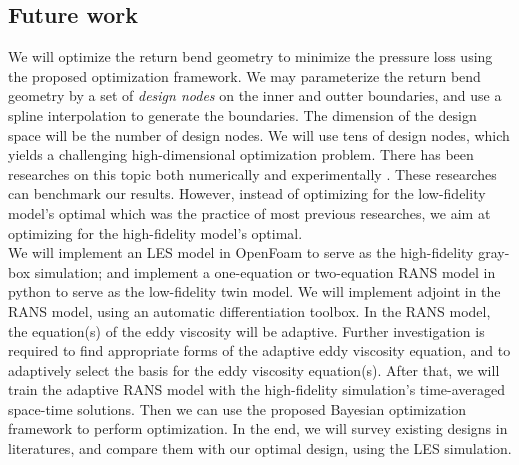\documentclass[a4paper,onecolumn]{article}
\theoremstyle{remark}
\begin{document}
\subsection{Future work}
\noindent We will optimize the return bend geometry to minimize the pressure loss using the
proposed optimization framework. We may parameterize the return bend
geometry by a set of \emph{design nodes} on the inner and outter boundaries, 
and use a spline interpolation to generate the
boundaries. The dimension of the design space will be the number of design nodes.
We will use tens of design nodes, which yields a challenging high-dimensional optimization problem.
There has been researches on this topic both numerically and experimentally
\cite{ubend rans opt 1, ubend rans opt 2}. These researches can benchmark our results.
However, instead of optimizing for the low-fidelity model's
optimal which was the practice of most previous researches,
we aim at optimizing for the high-fidelity model's optimal.\\

\noindent We will implement an LES model in OpenFoam to serve as the high-fidelity gray-box 
simulation; and implement a one-equation or two-equation RANS model in python to
serve as the low-fidelity twin model. We will implement adjoint in the RANS model, using
an automatic differentiation toolbox.
In the RANS model, the equation(s) of the eddy viscosity will be adaptive.
Further investigation is required to find appropriate forms of the adaptive 
eddy viscosity equation, and to adaptively select the basis for the eddy viscosity equation(s). 
After that, we will train the adaptive RANS model with the high-fidelity simulation's time-averaged 
space-time solutions. Then we can use the proposed Bayesian optimization framework 
to perform optimization. In the end, 
we will survey existing designs in literatures, and compare them with
our optimal design, using the LES simulation.\\
\end{document}
